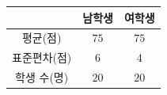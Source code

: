 {\renewcommand{\arraystretch}{1.3}\small
\begin{tabular}{|c|c|c|}
\hline
 & 남학생 & 여학생 \\ \hline
평균(점) & $75$ & $75$ \\ \hline
표준편차(점) & $6$ & $4$ \\ \hline
학생 수(명) & $20$ & $20$ \\ \hline
\end{tabular}}
